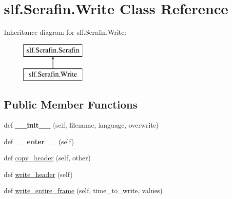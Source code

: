 \hypertarget{classslf_1_1_serafin_1_1_write}{}\section{slf.\+Serafin.\+Write Class Reference}
\label{classslf_1_1_serafin_1_1_write}
Inheritance diagram for slf.\+Serafin.\+Write\+:\begin{figure}[H]
\begin{center}
\leavevmode
\includegraphics[height=2.000000cm]{classslf_1_1_serafin_1_1_write}
\end{center}
\end{figure}
\subsection*{Public Member Functions}
\begin{DoxyCompactItemize}
\item 
def {\bfseries \+\_\+\+\_\+init\+\_\+\+\_\+} (self, filename, language, overwrite)\hypertarget{classslf_1_1_serafin_1_1_write_a097c657469abce61668f879cd3167a07}{}\label{classslf_1_1_serafin_1_1_write_a097c657469abce61668f879cd3167a07}

\item 
def {\bfseries \+\_\+\+\_\+enter\+\_\+\+\_\+} (self)\hypertarget{classslf_1_1_serafin_1_1_write_a9ac7a437717fdf5ffdb559a787c00abb}{}\label{classslf_1_1_serafin_1_1_write_a9ac7a437717fdf5ffdb559a787c00abb}

\item 
def \hyperlink{classslf_1_1_serafin_1_1_write_a58965f4b769975951c12460e9f4de23b}{copy\+\_\+header} (self, other)
\item 
def \hyperlink{classslf_1_1_serafin_1_1_write_ace45cd2113dfce6c0701e2cfd9113e88}{write\+\_\+header} (self)
\item 
def \hyperlink{classslf_1_1_serafin_1_1_write_a5e170ca8c638e1a940d65db347799ee6}{write\+\_\+entire\+\_\+frame} (self, time\+\_\+to\+\_\+write, values)
\end{DoxyCompactItemize}
